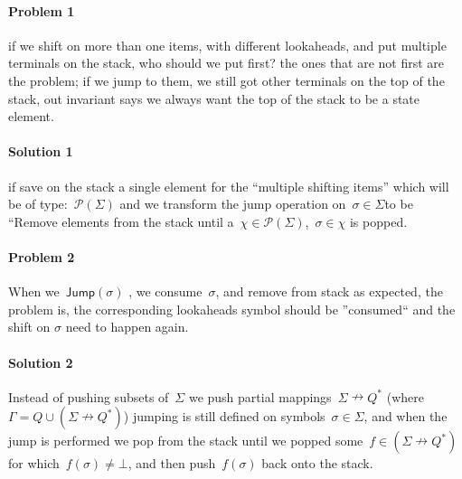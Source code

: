 \paragraph{Problem 1} if we shift on more than one items, with different lookaheads, and put multiple terminals on the stack,
  who should we put first? the ones that are not first are the problem; if we jump to them, we still got other terminals on the top of the stack,
  out invariant says we always want the top of the stack to be a state element.
  
\paragraph{Solution 1} if save on the stack a single element for the ``multiple shifting items'' which will be of type:~$\mathcal{P}(\Sigma)$
  and we transform the jump operation on~$\sigma\in\Sigma$to be ``Remove elements from the stack until a~$\chi\in\mathcal{P}(\Sigma)$,~$\sigma\in\chi$
  is popped.
  
\paragraph{Problem 2} When we~$\mathsf{Jump}(\sigma)$ , we consume~$\sigma$, and remove from stack as expected,
  the problem is, the corresponding lookaheads symbol should be ''consumed`` and the shift on $\sigma$ need to happen again.
  
\paragraph{Solution 2} Instead of pushing subsets of~$\Sigma$ we push partial mappings~$Σ↛Q^*$ (where~$\Gamma=Q\cup(Σ↛Q^*)$)
  jumping is still defined on symbols~$\sigma\in\Sigma$, and when the jump is performed we pop from the stack until we popped
  some~$f\in(Σ↛Q^*)$ for which~$f(\sigma)\neq\bot$, and then push~$f(\sigma)$ back onto the stack.